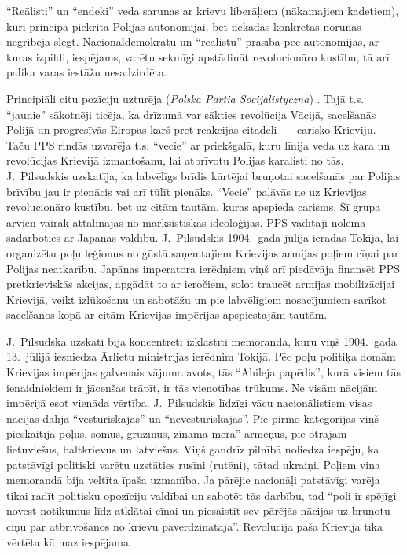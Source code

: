 \documentclass[twoside,a5paper,12pt,fleqn,openany]{extbook}
\newcommand{\pltxti}[1]{\textit{\textpolish{#1}}}
\begin{document}
``Reālisti'' un ``endeki'' veda sarunas ar krievu liberāļiem (nākamajiem kadetiem), kuri principā piekrita Polijas autonomijai, bet nekādas konkrētas norunas negribēja slēgt. Nacionāldemokrātu un ``reālistu'' prasība pēc autonomijas, ar kuras izpildi, iespējams, varētu sekmīgi apstādināt revolucionāro kustību, tā arī palika varas iestāžu nesadzirdēta.

Principiāli citu pozīciju uzturēja  (\pltxti{Polska Partia Socijalistyczna}) . Tajā t.s. ``jaunie'' sākotnēji ticēja, ka drīzumā var sākties revolūcija Vācijā, sacelšanās Polijā un progresīvās Eiropas karš pret reakcijas citadeli~--- carisko Krieviju. Taču PPS rindās uzvarēja t.s. ``vecie'' ar  priekšgalā, kuru līnija veda uz kara un revolūcijas Krievijā izmantošanu, lai atbrīvotu Polijas karalisti no tās. J.~Pilsudskis uzskatīja, ka labvēlīgs brīdis kārtējai bruņotai sacelšanās par Polijas brīvību jau ir pienācis vai arī tūlīt pienāks. ``Vecie'' paļāvās ne uz Krievijas revolucionāro kustību, bet uz citām tautām, kuras apspieda carisms. Šī grupa arvien vairāk attālinājās no marksistiskās ideoloģijas. PPS vadītāji nolēma sadarboties ar Japānas valdību. J.~Pilsudskis 1904.~gada jūlijā ieradās Tokijā, lai organizētu poļu leģionus no gūstā saņemtajiem Krievijas armijas poļiem cīņai par Polijas neatkarību. Japānas imperatora ierēdņiem viņš arī piedāvāja finansēt PPS pretkrieviskās akcijas, apgādāt to ar ieročiem, solot traucēt armijas mobilizācijai Krievijā, veikt izlūkošanu un sabotāžu un pie labvēlīgiem nosacījumiem sarīkot sacelšanos kopā ar citām Krievijas impērijas apspiestajām tautām.

J.~Pilsudska uzskati bija koncentrēti izklāstīti memorandā, kuru viņš 1904.~gada 13.~jūlijā iesniedza Ārlietu ministrijas ierēdnim Tokijā. Pēc poļu politiķa domām Krievijas impērijas galvenais vājuma avots, tās ``Ahileja papēdis'', kurā visiem tās ienaidniekiem ir jācenšas trāpīt, ir tās vienotības trūkums. Ne visām nācijām impērijā esot vienāda vērtība. J.~Pilsudskis līdzīgi vācu nacionālistiem visas nācijas dalīja ``vēsturiskajās'' un ``nevēsturiskajās''. Pie pirmo kategorijas viņš pieskaitīja poļus, somus, gruzīnus, zināmā mērā'' armēņus, pie otrajām~--- lietuviešus, baltkrievus un latviešus. Viņš gandrīz pilnībā noliedza iespēju, ka patstāvīgi politiski varētu uzstāties rusīni (rutēņi), tātad ukraiņi. Poļiem viņa memorandā bija veltīta īpaša uzmanība. Ja pārējie nacionāļi patstāvīgi varēja tikai radīt politisku opozīciju valdībai un sabotēt tās darbību, tad ``poļi ir spējīgi novest notikumus līdz atklātai cīņai un piesaistīt sev pārējās nācijas uz bruņotu cīņu par atbrīvošanos no krievu paverdzinātāja''. Revolūcija pašā Krievijā tika vērtēta kā maz iespējama.
\end{document}
